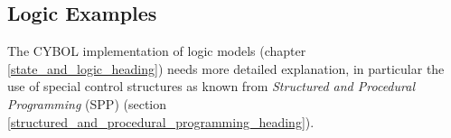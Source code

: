 %
%
%
%
%
%
%

\subsection{Logic Examples}
\label{logic_examples_heading}

The CYBOL implementation of logic models (chapter \ref{state_and_logic_heading})
needs more detailed explanation, in particular the use of special control
structures as known from \emph{Structured and Procedural Programming} (SPP)
(section \ref{structured_and_procedural_programming_heading}).






